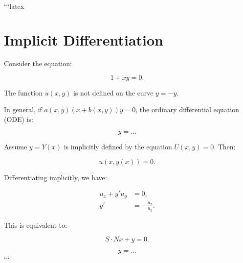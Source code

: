 ```latex
\section*{Implicit Differentiation}

Consider the equation:

\begin{equation}
1 + xy = 0.
\end{equation}

The function \( u(x, y) \) is not defined on the curve \( y = -y \).

In general, if \( a(x, y)(x + b(x, y))y = 0 \), the ordinary differential equation (ODE) is:

\begin{equation}
y = \ldots
\end{equation}

Assume \( y = Y(x) \) is implicitly defined by the equation \( U(x, y) = 0 \). Then:

\begin{equation}
u(x, y(x)) = 0.
\end{equation}

Differentiating implicitly, we have:

\begin{align}
u_x + y' u_y &= 0, \\
y' &= -\frac{u_x}{u_y}.
\end{align}

This is equivalent to:

\begin{equation}
S \cdot Nx + y = 0.
\end{equation}

\begin{equation}
y = \ldots
\end{equation}
```
